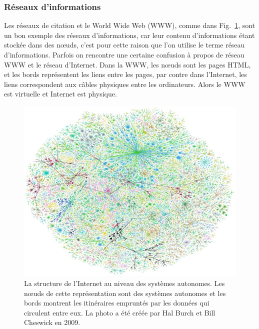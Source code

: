   \subsubsection{Réseaux d'informations}        
 Les  réseaux de citation et le World Wide Web (WWW), comme dans Fig.~\ref{WWW}, sont un bon exemple des réseaux d'informations, car leur contenu d'informations étant stockée dans des nœuds, c’est pour cette raison que l’on utilise le terme réseau d’informations. Parfois on rencontre une certaine confusion à propos de réseau  WWW  et le réseau d'Internet. Dans la WWW, les nœuds sont les pages HTML, et les bords représentent les liens entre les pages, par contre  dans l'Internet, les liens correspondent aux câbles physiques entre les ordinateurs. Alors  le WWW est virtuelle et Internet est physique.
\begin{figure}[h!]
	\centering
	\includegraphics[scale=0.3]{./figures/www2}
	\caption{La structure de l'Internet au niveau des systèmes autonomes. Les nœuds de cette représentation sont des systèmes autonomes et les bords montrent les itinéraires empruntés par les données qui circulent entre eux. La photo a été créée par Hal Burch et Bill Cheswick en 2009.}
	\label{WWW}
\end{figure}

